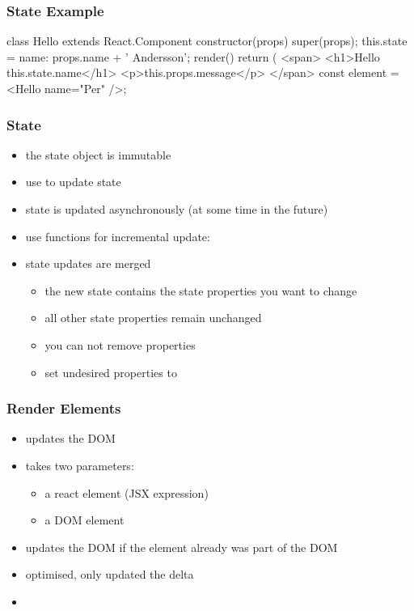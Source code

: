 \begin{frame}[fragile] \frametitle{State Example}
\begin{CodeBox}{}
class Hello extends React.Component {
  constructor(props) {
    super(props);
    this.state = {name: props.name + ' Andersson'};
  }
  render() {
    return (
      <span>
        <h1>Hello {this.state.name}</h1>
        <p>{this.props.message}</p>
      </span>
  }
}
const element = <Hello name="Per" />;
\end{CodeBox}
\end{frame}

\begin{frame}[fragile] \frametitle{State}
\begin{itemize}
  \item the state object is immutable
  \item use  to update state
  \item state is updated asynchronously (at some time in the future)
  \item use functions for incremental update: 
  \item state updates are merged
  \begin{itemize}
    \item the new state contains the state properties you want to change
    \item all other state properties remain unchanged
    \item you can not remove properties
    \item set undesired properties to 
  \end{itemize}
\end{itemize}
\end{frame}

\begin{frame}[fragile] \frametitle{Render Elements}
\begin{itemize}
  \item updates the DOM
  \item takes two parameters:
  \begin{itemize}
    \item a react element (JSX expression)
    \item a DOM element
  \end{itemize}
  \item updates the DOM if the element already was part of the DOM
  \item optimised, only updated the delta
  \item 
\end{itemize}
\end{frame}

